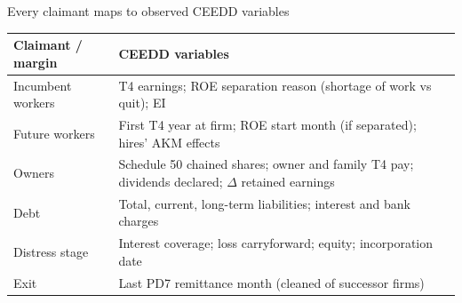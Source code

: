 \documentclass[aspectratio=169,11pt]{beamer}
\newlength{\safezone}
\begin{document}
\begin{frame}[label=datamap]{Every claimant maps to observed CEEDD variables}
  \small
  \renewcommand{\arraystretch}{1.2}
  \begin{tabularx}{\textwidth}{>{\raggedright\arraybackslash}p{3.2cm} >{\raggedright\arraybackslash}X}
    \toprule
    \textbf{Claimant / margin} & \textbf{CEEDD variables} \\
    \midrule
    Incumbent workers & T4 earnings; ROE separation reason (shortage of work vs quit); EI \\
    Future workers & First T4 year at firm; ROE start month (if separated); hires' AKM effects \\
    Owners & Schedule 50 chained shares; owner and family T4 pay; dividends declared; $\Delta$ retained earnings \\
    Debt & Total, current, long-term liabilities; interest and bank charges \\
    Distress stage & Interest coverage; loss carryforward; equity; incorporation date \\
    Exit & Last PD7 remittance month (cleaned of successor firms) \\
    \bottomrule
  \end{tabularx}
  \vfill
  \hfill \hyperlink{data}{}\hspace{\safezone}
\end{frame}
\end{document}
